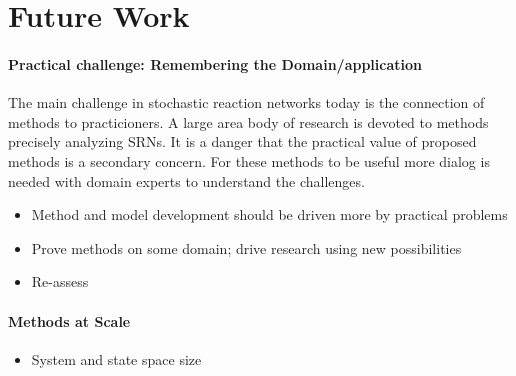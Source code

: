 \section{Future Work}
\paragraph{Practical challenge: Remembering the Domain/application} The main challenge in stochastic reaction networks today is the connection of methods to practicioners.
A large area body of research is devoted to methods precisely analyzing \acp{SRN}.
It is a danger that the practical value of proposed methods is a secondary concern.
For these methods to be useful more dialog is needed with domain experts to understand the challenges.
\begin{itemize}
  \item Method and model development should be driven more by practical problems
  \item Prove methods on some domain; drive research using new possibilities
  \item Re-assess 
\end{itemize}

\paragraph{Methods at Scale}
\begin{itemize}
  \item System and state space size
\end{itemize}
